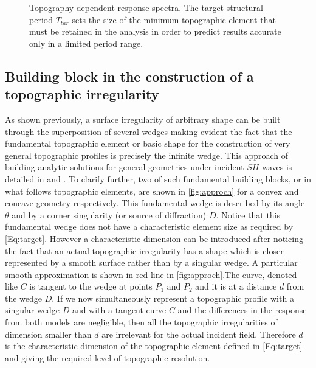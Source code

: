\documentclass[11pt,letterpaper]{article}
\begin{document}
\begin{figure}[H]
	\centering
	\caption{\small Topography dependent response spectra. The target structural period ${T_{tar}}$ sets the size of the minimum topographic element that must be retained in the analysis in order to predict results accurate only in a limited period range.} 
	\label{fig:part_spec}
\end{figure}


\subsection*{Building block in the construction of a topographic irregularity}

As shown previously, a surface irregularity of arbitrary shape can be built through the superposition of several wedges making evident the fact that the fundamental topographic element or basic shape for the construction of very general topographic profiles is precisely the infinite wedge. This approach of building analytic solutions for general geometries under incident $SH$ waves is detailed in \cite{Jaramillo2012Analytic} and \cite{Gomez2016superposition}. To clarify further, two of such fundamental building blocks, or in what follows topographic elements, are shown in \cref{fig:approch} for a convex and concave geometry respectively. This fundamental wedge is described by its angle $\theta$ and by a corner singularity (or source of diffraction) $D$. Notice that this fundamental wedge does not have a characteristic element size as required by \cref{Eq:target}. However a characteristic dimension can be introduced after noticing the fact that an actual topographic irregularity has a shape which is closer represented by a smooth surface rather than by a singular wedge. A particular smooth approximation is shown in red line in \cref{fig:approch}.The curve, denoted like $C$ is tangent to the wedge at points $P_1$ and $P_2$ and it is at a distance $d$ from the wedge $D$. If we now simultaneously represent a topographic profile with a singular wedge $D$ and with a tangent curve $C$ and the differences in the response from both models are negligible, then all the topographic irregularities of dimension smaller than $d$ are irrelevant for the actual incident field. Therefore $d$ is the characteristic dimension of the topographic element defined in \cref{Eq:target} and giving the required level of topographic resolution.
\end{document}

